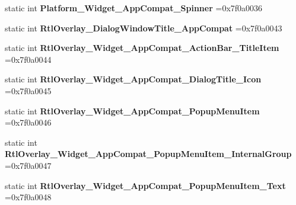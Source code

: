 \begin{DoxyCompactItemize}
\mbox{\label{classandroid_1_1support_1_1design_1_1R_1_1style_a86dbb58226a3b33ad675e9c5824fed5e}} 
static int {\bfseries Platform\+\_\+\+Widget\+\_\+\+App\+Compat\+\_\+\+Spinner} =0x7f0a0036
\item 
\mbox{\label{classandroid_1_1support_1_1design_1_1R_1_1style_affaa46c08a1f03d6f2ff18abc52b2977}} 
static int {\bfseries Rtl\+Overlay\+\_\+\+Dialog\+Window\+Title\+\_\+\+App\+Compat} =0x7f0a0043
\item 
\mbox{\label{classandroid_1_1support_1_1design_1_1R_1_1style_a1a421a81eed9527ee88f4bccb253129b}} 
static int {\bfseries Rtl\+Overlay\+\_\+\+Widget\+\_\+\+App\+Compat\+\_\+\+Action\+Bar\+\_\+\+Title\+Item} =0x7f0a0044
\item 
\mbox{\label{classandroid_1_1support_1_1design_1_1R_1_1style_a43acc1581afb3d6783552e26b1a0ef65}} 
static int {\bfseries Rtl\+Overlay\+\_\+\+Widget\+\_\+\+App\+Compat\+\_\+\+Dialog\+Title\+\_\+\+Icon} =0x7f0a0045
\item 
\mbox{\label{classandroid_1_1support_1_1design_1_1R_1_1style_a1f4edd34ebd437e58153dbee0d4c00b5}} 
static int {\bfseries Rtl\+Overlay\+\_\+\+Widget\+\_\+\+App\+Compat\+\_\+\+Popup\+Menu\+Item} =0x7f0a0046
\item 
\mbox{\label{classandroid_1_1support_1_1design_1_1R_1_1style_a3fdfc8567c4d1c446ec04dcbad8525d4}} 
static int {\bfseries Rtl\+Overlay\+\_\+\+Widget\+\_\+\+App\+Compat\+\_\+\+Popup\+Menu\+Item\+\_\+\+Internal\+Group} =0x7f0a0047
\item 
\mbox{\label{classandroid_1_1support_1_1design_1_1R_1_1style_a4523c0f67d42f637ff4e28a3347fb017}} 
static int {\bfseries Rtl\+Overlay\+\_\+\+Widget\+\_\+\+App\+Compat\+\_\+\+Popup\+Menu\+Item\+\_\+\+Text} =0x7f0a0048
\item 
\mbox{\label{classandroid_1_1support_1_1design_1_1R_1_1style_ab0ffa3b72aa13e75f726fad55007167e}} 

\end{DoxyCompactItemize}
